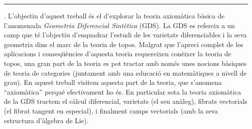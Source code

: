 \documentclass[12pt]{amsbook}
\begin{document}
\par\noindent\rule[0.2cm]{\textwidth}{0.4pt}

. L'objectiu d'aquest treball \'es el d'explorar la teoria axiom\`atica b\`asica de l'anomenada \emph{Geometria Diferencial Sint\`etica} (GDS). La GDS es refereix a un camp que t\'e l'objectiu d'enquadrar l'estudi de les varietats diferenciables i la seva geometria dins el marc de la teoria de topos. Malgrat que l'apreci complet de les aplicacions i conseq\"u\`encies d'aquesta teoria requereixen con\`eixer la teoria de topos, una gran part de la teoria es pot tractar amb nom\'es unes nocions b\`asiques de teoria de categories (juntament amb una educaci\'o en matem\`atiques a nivell de grau). En aquest treball visitem aquesta part de la teoria, que s'anomena ``axiom\`atica'' perqu\'e efectivament ho \'es. En particular sota la teoria axiom\`atica de la GDS tractem el c\`alcul diferencial, varietats (el seu an\`aleg), fibrats vectorials (el fibrat tangent en especial), i finalment camps vectorials (amb la seva estructura d'\`algebra de Lie).

\tableofcontents


\mainmatter







\backmatter



\end{document}
